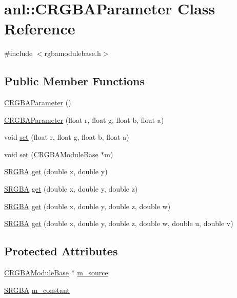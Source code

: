 \hypertarget{classanl_1_1CRGBAParameter}{
\section{anl::CRGBAParameter Class Reference}
\label{classanl_1_1CRGBAParameter}
}


{\ttfamily \#include $<$rgbamodulebase.h$>$}\subsection*{Public Member Functions}
\begin{DoxyCompactItemize}
\item 
\hyperlink{classanl_1_1CRGBAParameter_a5b92a7935dcf3998ed3250f536fff651}{CRGBAParameter} ()
\item 
\hyperlink{classanl_1_1CRGBAParameter_aa6df86cd9c0a9844d8004e63344a6f58}{CRGBAParameter} (float r, float g, float b, float a)
\item 
void \hyperlink{classanl_1_1CRGBAParameter_a95e40e0fc16dc9e05dfce27f99957695}{set} (float r, float g, float b, float a)
\item 
void \hyperlink{classanl_1_1CRGBAParameter_aff279a94ad0da6922362e41ed621995a}{set} (\hyperlink{classanl_1_1CRGBAModuleBase}{CRGBAModuleBase} $\ast$m)
\item 
\hyperlink{structanl_1_1SRGBA}{SRGBA} \hyperlink{classanl_1_1CRGBAParameter_a078b10c4c7d73a2a0be56335d6ee6f98}{get} (double x, double y)
\item 
\hyperlink{structanl_1_1SRGBA}{SRGBA} \hyperlink{classanl_1_1CRGBAParameter_ae027fa3fd1b2ce2c45ba5a62e0f74002}{get} (double x, double y, double z)
\item 
\hyperlink{structanl_1_1SRGBA}{SRGBA} \hyperlink{classanl_1_1CRGBAParameter_ae47723228d7565636c99e414fd4afe1f}{get} (double x, double y, double z, double w)
\item 
\hyperlink{structanl_1_1SRGBA}{SRGBA} \hyperlink{classanl_1_1CRGBAParameter_a3bbe14b12e8b577b90d94f45c12d8a66}{get} (double x, double y, double z, double w, double u, double v)
\end{DoxyCompactItemize}
\subsection*{Protected Attributes}
\begin{DoxyCompactItemize}
\item 
\hyperlink{classanl_1_1CRGBAModuleBase}{CRGBAModuleBase} $\ast$ \hyperlink{classanl_1_1CRGBAParameter_a4c1972ddf774b961c306c9725d3b9ac8}{m\_\-source}
\item 
\hyperlink{structanl_1_1SRGBA}{SRGBA} \hyperlink{classanl_1_1CRGBAParameter_a55fdb9fe2561c3eba15e7fa283129d9a}{m\_\-constant}
\end{DoxyCompactItemize}


